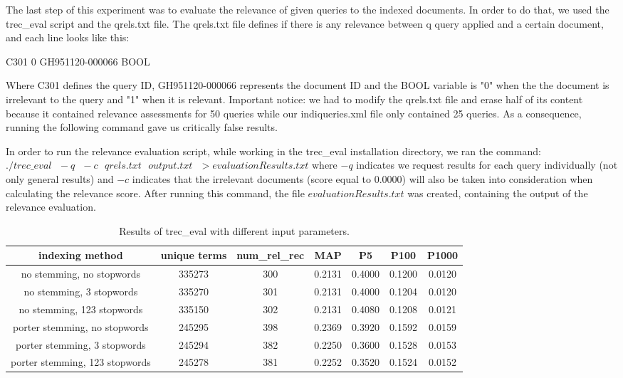 \documentclass[letterpaper,11pt]{article}
\begin{document}
The last step of this experiment was to evaluate the relevance of given queries to the indexed documents. In order to do that, we used the trec\_eval script  and the qrels.txt file. The qrels.txt file defines if there is any relevance between q query applied and a certain document, and each line looks like this: 

C301 0 GH951120-000066 BOOL


Where C301 defines the query ID, GH951120-000066 represents the document ID and the BOOL variable is "0" when the the document is irrelevant to the query and "1" when it is relevant. Important notice: we had to modify the qrels.txt file and erase half of its content because it contained relevance assessments for 50 queries while our indiqueries.xml file only contained 25 queries. As a consequence, running the following command gave us critically false results.

In order to run the relevance evaluation script, while working in the trec\_eval installation directory, we ran the command: $./trec\_eval \text{ } -q \text{ } -c \text{ } qrels.txt \text{ } output.txt \text{ }>evaluationResults.txt$ where $-q$ indicates we request results for each query individually (not only general results) and $-c$ indicates that the irrelevant documents (score equal to 0.0000) will also be taken into consideration when calculating the relevance score. After running this command, the file $evaluationResults.txt$ was created, containing the output of the relevance evaluation.

\newpage


\begin{table}[h]
\begin{center}
\begin{tabular}{ccccccc}
\textbf{ indexing method} & \textbf{unique terms} & \textbf{num\_rel\_rec} & \textbf{MAP} & \textbf{P5} & \textbf{P100} & \textbf{P1000} \\ \hline
no stemming, no stopwords & 335273 & 300 & 0.2131 & 0.4000 & 0.1200 & 0.0120 \\
no stemming, 3 stopwords & 335270 & 301 & 0.2131 & 0.4000 & 0.1204 & 0.0120 \\
no stemming, 123 stopwords & 335150 & 302 & 0.2131 & 0.4080 & 0.1208 & 0.0121 \\
porter stemming, no stopwords & 245295 & 398 & 0.2369 & 0.3920 & 0.1592 & 0.0159 \\
porter stemming, 3 stopwords & 245294 & 382 & 0.2250 & 0.3600 & 0.1528 & 	0.0153 \\
porter stemming, 123 stopwords &  245278 & 381 & 0.2252 & 0.3520 & 0.1524 & 	0.0152 \\	
\end{tabular}
\end{center}
\caption{Results of trec\_eval with different input parameters.}
\end{table}
\end{document}
